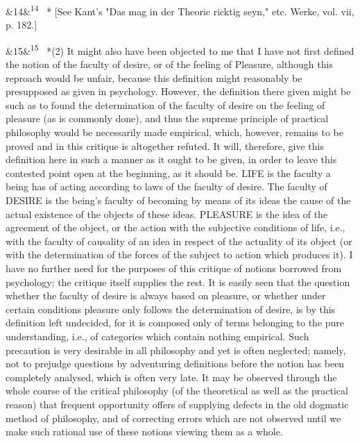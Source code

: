 \documentclass[12pt]{article}
\newcommand{\para}[1][]{\par\noindent\ifx&#1&\else\textsuperscript{\footnotesize #1}~\fi}
\begin{document}
\para[14] * [See Kant's "Das mag in der Theoric ricktig seyn," etc. Werke, vol. vii, p. 182.]

\para[15] *(2) It might also have been objected to me that I have not first defined the notion of the faculty of desire, or of the feeling of Pleasure, although this reproach would be unfair, because this definition might reasonably be presupposed as given in psychology. However, the definition there given might be such as to found the determination of the faculty of desire on the feeling of pleasure (as is commonly done), and thus the supreme principle of practical philosophy would be necessarily made empirical, which, however, remains to be proved and in this critique is altogether refuted. It will, therefore, give this definition here in such a manner as it ought to be given, in order to leave this contested point open at the beginning, as it should be. LIFE is the faculty a being has of acting according to laws of the faculty of desire. The faculty of DESIRE is the being's faculty of becoming by means of its ideas the cause of the actual existence of the objects of these ideas. PLEASURE is the idea of the agreement of the object, or the action with the subjective conditions of life, i.e., with the faculty of causality of an idea in respect of the actuality of its object (or with the determination of the forces of the subject to action which produces it). I have no further need for the purposes of this critique of notions borrowed from psychology; the critique itself supplies the rest. It is easily seen that the question whether the faculty of desire is always based on pleasure, or whether under certain conditions pleasure only follows the determination of desire, is by this definition left undecided, for it is composed only of terms belonging to the pure understanding, i.e., of categories which contain nothing empirical. Such precaution is very desirable in all philosophy and yet is often neglected; namely, not to prejudge questions by adventuring definitions before the notion has been completely analysed, which is often very late. It may be observed through the whole course of the critical philosophy (of the theoretical as well as the practical reason) that frequent opportunity offers of supplying defects in the old dogmatic method of philosophy, and of correcting errors which are not observed until we make such rational use of these notions viewing them as a whole.
\end{document}
